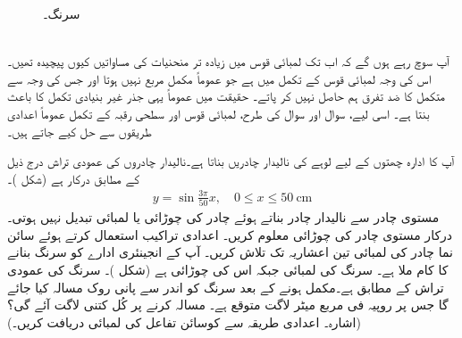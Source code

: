 \begin{figure}
\begin{minipage}{0.34\textwidth}
\caption{سرنگ۔}
\label{شکل_سوال_تکمل_استعمال_سرنگ}
\end{minipage}
\end{figure}

\\
آپ سوچ رہے ہوں گے کہ  اب تک لمبائی قوس میں زیادہ تر منحنیات کی مساواتیں  کیوں پیچیدہ تھیں۔ اس کی وجہ لمبائی قوس کے تکمل میں  ہے جو عموماً مکمل مربع نہیں ہوتا  اور جس کی وجہ سے متکمل کا ضد تفرق ہم حاصل نہیں کر پاتے۔ حقیقت میں عموماً یہی جذر غیر بنیادی تکمل کا باعث بنتا ہے۔ اسی لیے، سوال  اور سوال   کی طرح،  لمبائی قوس اور سطحی رقبہ کے تکمل  عموماً اعدادی طریقوں سے حل کیے  جاتے ہیں۔ 

آپ کا ادارہ چھتوں کے لیے لوہے کی  نالیدار چادریں بناتا ہے۔نالیدار چادروں کی عمودی تراش درج ذیل کے مطابق درکار ہے (شکل )۔
\begin{align*}
y=\sin\frac{3\pi}{50}x,\quad0\le x\le \SI{50}{\centi\meter}
\end{align*}
مستوی چادر سے نالیدار چادر بناتے ہوئے چادر کی چوڑائی یا لمبائی تبدیل نہیں ہوتی۔ درکار مستوی چادر کی چوڑائی معلوم کریں۔ اعدادی تراکیب استعمال کرتے ہوئے سائن نما چادر کی  لمبائی تین اعشاریہ تک تلاش کریں۔
آپ کے انجینئری ادارے کو سرنگ بنانے کا کام ملا ہے۔ سرنگ کی لمبائی  جبکہ اس کی چوڑائی  ہے (شکل )۔ سرنگ کی عمودی تراش  کے مطابق ہے۔مکمل ہونے کے بعد سرنگ کو اندر سے  پانی روک مسالہ کیا جائے گا جس پر  روپیہ فی مربع میٹر لاگت متوقع ہے۔ مسالہ کرنے پر کُل کتنی لاگت آئے گی؟ (اشارہ۔ اعدادی طریقہ سے کوسائن تفاعل کی لمبائی دریافت کریں۔)

